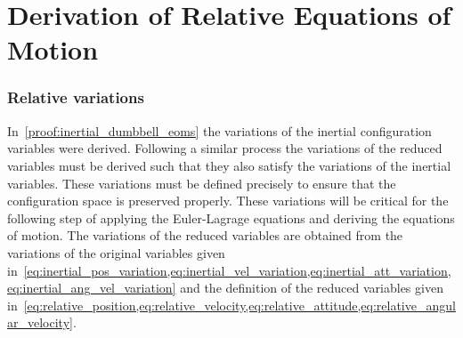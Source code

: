 
\chapter{Derivation of Relative Equations of Motion}\label{proof:relative_dumbbell_eoms}

\subsection{Relative variations}\label{ssec:relative_variations}
In~\cref{proof:inertial_dumbbell_eoms} the variations of the inertial configuration variables were derived.
Following a similar process the variations of the reduced variables must be derived such that they also satisfy the variations of the inertial variables.
These variations must be defined precisely to ensure that the configuration space is preserved properly. 
These variations will be critical for the following step of applying the Euler-Lagrage equations and deriving the equations of motion.
The variations of the reduced variables are obtained from the variations of the original variables given in~\cref{eq:inertial_pos_variation,eq:inertial_vel_variation,eq:inertial_att_variation,eq:inertial_ang_vel_variation} and the definition of the reduced variables given in~\cref{eq:relative_position,eq:relative_velocity,eq:relative_attitude,eq:relative_angular_velocity}.

